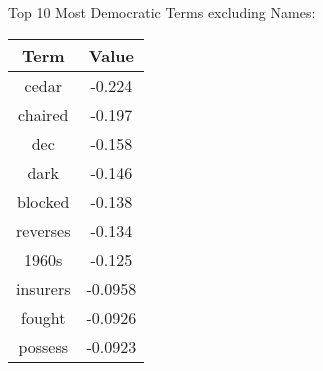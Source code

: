 \documentclass[xcolor=pdftex,dvipsnames,table]{beamer}
\begin{document}
\frame
{
	Top 10 Most Democratic Terms excluding Names:
	\begin{table}[htdp]
	\begin{center}
	\begin{tabular}{|c|c|}
	\hline
	Term & Value \\ 
	\hline
	cedar & -0.224 \\
	chaired & -0.197 \\
	dec & -0.158 \\
	dark & -0.146 \\
	blocked & -0.138 \\
	reverses & -0.134 \\
	1960s & -0.125 \\
	insurers & -0.0958 \\
	fought & -0.0926 \\
	possess & -0.0923 \\
	\hline
	\end{tabular}
	\end{center}
	\label{default}
	\end{table}
}
\end{document}
